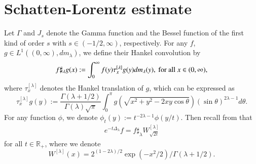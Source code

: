 \documentclass[12pt]{amsart}
\begin{document}
\section{Schatten-Lorentz estimate}
Let $\Gamma$ and $J_s$ denote the Gamma function and the Bessel function of the first kind of order $s$ with $s\in (-1/2,\infty)$, respectively. For any $f$, $g\in L^1((0,\infty),dm_\lambda)$, we define their Hankel convolution by
$$f\sharp_\lambda g(x):=\int_0^\infty f(y)\tau_x^{[\lambda]}g(y)dm_\lambda(y),\ {\rm for}\ {\rm all}\ x\in (0,\infty),$$
where $\tau_x^{[\lambda]}$ denotes the Hankel translation of $g$, which can be expressed as
$$\tau_x^{[\lambda]}g(y):=\frac{\Gamma(\lambda+1/2)}{\Gamma(\lambda)\sqrt{\pi}}\int_0^\pi g(\sqrt{x^2+y^2-2xy\cos\theta})(\sin\theta)^{2\lambda-1}d\theta.$$
For any function $\phi$, we denote $\phi_t(y):=t^{-2\lambda-1}\phi(y/t)$. Then recall from \cite{MR2496404} that \begin{align}\label{heatex}
e^{-t\Delta_\lambda}f=f\sharp_\lambda W_{\sqrt{2t}}^{[\lambda]}
\end{align}
 for all $t\in\mathbb{R}_+$, where we denote
$$W^{[\lambda]}(x)=2^{(1-2\lambda)/2}\exp(-x^2/2)/\Gamma(\lambda+1/2).$$
\end{document}
